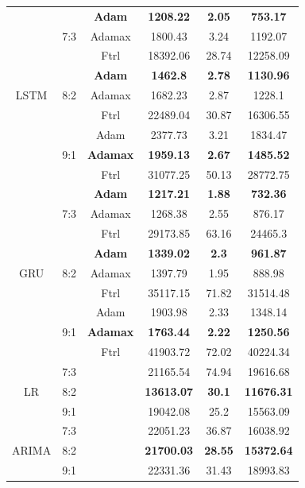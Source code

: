 \documentclass{ieeeojies}
\begin{document}
\begin{table}[H]
\begin{tabular}{|c|c|c|c|c|c|}
        \multirow{9}{*}{LSTM} & \multirow{3}{*}{7:3} & \textbf{Adam} & \textbf{1208.22} & \textbf{2.05} & \textbf{753.17} \\ \cline{3-6}
         &  & Adamax & 1800.43 & 3.24 & 1192.07 \\ \cline{3-6}
         &  & Ftrl & 18392.06 & 28.74 & 12258.09 \\ \cline{2-6}
         & \multirow{3}{*}{8:2} & \textbf{Adam} & \textbf{1462.8} & \textbf{2.78} & \textbf{1130.96} \\ \cline{3-6}
         &  & Adamax & 1682.23 & 2.87 & 1228.1 \\ \cline{3-6}
         &  & Ftrl & 22489.04 & 30.87 & 16306.55 \\ \cline{2-6}
         & \multirow{3}{*}{9:1}& Adam & 2377.73 & 3.21 & 1834.47 \\ \cline{3-6}
         & & \textbf{Adamax} & \textbf{1959.13} & \textbf{2.67} & \textbf{1485.52} \\
         \cline{3-6}
         &  & Ftrl & 31077.25 & 50.13 & 28772.75 \\ \hline

         \multirow{9}{*}{GRU} & \multirow{3}{*}{7:3} & \textbf{Adam} & \textbf{1217.21} & \textbf{1.88} & \textbf{732.36} \\ \cline{3-6}
         &  & Adamax & 1268.38 & 2.55 & 876.17 \\ \cline{3-6}
         &  & Ftrl & 29173.85 & 63.16 & 24465.3 \\ \cline{2-6}
         & \multirow{3}{*}{8:2} & \textbf{Adam} & \textbf{1339.02} & \textbf{2.3} & \textbf{961.87} \\ \cline{3-6}
         &  & Adamax & 1397.79 & 1.95 & 888.98 \\ \cline{3-6}
         &  & Ftrl & 35117.15 & 71.82 & 31514.48 \\ \cline{2-6}
         & \multirow{3}{*}{9:1} & Adam & 1903.98 & 2.33 & 1348.14 \\
        \cline{3-6}
         &  & \textbf{Adamax} & \textbf{1763.44} & \textbf{2.22} & \textbf{1250.56} \\ \cline{3-6}
         &  & Ftrl & 41903.72 & 72.02 & 40224.34 \\ \hline
         
        \multirow{3}{*}{LR} & 7:3 &  & 21165.54 & 74.94 & 19616.68 \\ \cline{2-6}
         & 8:2 &  & \textbf{13613.07} & \textbf{30.1} & \textbf{11676.31} \\ \cline{2-6}

         & 9:1 &  & 19042.08 & 25.2 & 15563.09 \\ \hline

        \multirow{3}{*}{ARIMA} & 7:3 &  & 22051.23 & 36.87 & 16038.92 \\ \cline{2-6}
         & 8:2 &  & \textbf{21700.03} & \textbf{28.55} & \textbf{15372.64} \\ \cline{2-6}

         & 9:1 &  & 22331.36 & 31.43 & 18993.83 \\ \hline
         
    \end{tabular}
\end{table}
\end{document}
